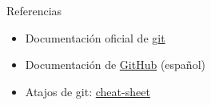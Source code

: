 \documentclass{beamer}
\begin{document}
\begin{frame}{Referencias}

  \begin{itemize}
    
    \item Documentación oficial de \href{https://git-scm.com}{git} 
    \item Documentación de \href{https://docs.github.com/es}{GitHub} (español)
    \item Atajos de git: \href{https://training.github.com/downloads/es_ES/github-git-cheat-sheet/}{cheat-sheet}
  \end{itemize}

\end{frame}
\end{document}
